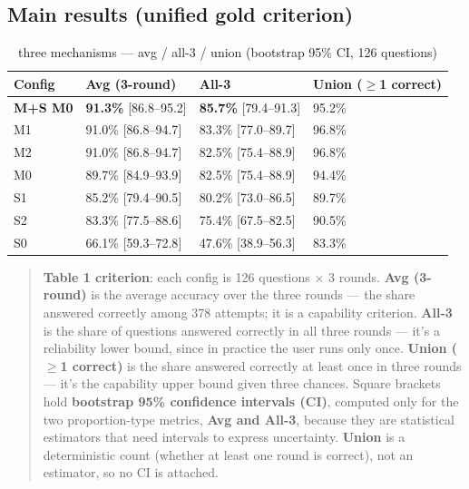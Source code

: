 \documentclass[11pt]{article}
\begin{document}
\subsection{Main results (unified gold criterion)}

\begin{table}[htbp]
\centering
\caption{three mechanisms --- avg / all-3 / union (bootstrap 95\% CI, 126 questions)}
\label{tab:1}
\small
\begin{tabular}{@{}llll@{}}
\toprule
Config & Avg (3-round) & All-3 & Union ($\geq$1 correct) \\
\midrule
\textbf{M+S M0} & \textbf{91.3\%} {[}86.8--95.2{]} & \textbf{85.7\%} {[}79.4--91.3{]} & 95.2\% \\
M1 & 91.0\% {[}86.8--94.7{]} & 83.3\% {[}77.0--89.7{]} & 96.8\% \\
M2 & 91.0\% {[}86.8--94.7{]} & 82.5\% {[}75.4--88.9{]} & 96.8\% \\
M0 & 89.7\% {[}84.9--93.9{]} & 82.5\% {[}75.4--88.9{]} & 94.4\% \\
S1 & 85.2\% {[}79.4--90.5{]} & 80.2\% {[}73.0--86.5{]} & 89.7\% \\
S2 & 83.3\% {[}77.5--88.6{]} & 75.4\% {[}67.5--82.5{]} & 90.5\% \\
S0 & 66.1\% {[}59.3--72.8{]} & 47.6\% {[}38.9--56.3{]} & 83.3\% \\
\bottomrule
\end{tabular}
\end{table}

\begin{quote}
\textbf{Table 1 criterion}: each config is 126 questions $\times$ 3 rounds. \textbf{Avg (3-round)} is the average accuracy over the three rounds --- the share answered correctly among 378 attempts; it is a capability criterion. \textbf{All-3} is the share of questions answered correctly in all three rounds --- it's a reliability lower bound, since in practice the user runs only once. \textbf{Union ($\geq$1 correct)} is the share answered correctly at least once in three rounds --- it's the capability upper bound given three chances. Square brackets hold \textbf{bootstrap 95\% confidence intervals (CI)}, computed only for the two proportion-type metrics, \textbf{Avg and All-3}, because they are statistical estimators that need intervals to express uncertainty. \textbf{Union} is a deterministic count (whether at least one round is correct), not an estimator, so no CI is attached.
\end{quote}
\end{document}
